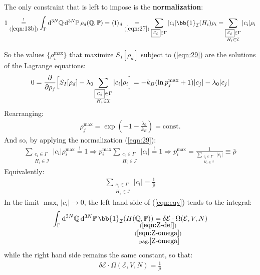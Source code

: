 \documentclass[../../main.tex]{subfiles}
\begin{document}
The only constraint that is left to impose is the \textbf{normalization}: 
\begin{align}\label{eqn:29}
    1 \underset{(\ref{eqn:13b})}{\overset{!}{=} } \int_{\Gamma} \dd[3N]{\mathbb{Q}} \dd[3N]{\mathbb{P}} \rho_d(\mathbb{Q}, \mathbb{P}) = \langle 1 \rangle_d \underset{(\ref{eqn:27})}{=}  \sum_{\boxed{c_i} \in \Gamma} |c_i| \bb{1}_{\mathcal{I}} (H_i) \rho_i =\sum_{\substack{\boxed{c_i} \in \Gamma\\H_i \in \mathcal{I}}} |c_i| \rho_i
\end{align}

So the values $\{\rho_i^{\max}\}$ that maximize $S_I[\rho_d]$ subject to (\ref{eqn:29}) are the solutions of the Lagrange equations:
\begin{align*}
    0 = \pdv{\rho_j} \Big[S_I[\rho_d]- \lambda_0 \sum_{\substack{\boxed{c_i} \in \Gamma\\H_i \in \mathcal{I}}} |c_i| \rho_i\Big] = -k_B(\ln p_j^{\max} + 1) |c_j| - \lambda_0 |c_j|
\end{align*}
Rearranging:
\begin{align}\label{eqn:30}
    \rho_j^{\max} = \exp\left(-1-\frac{\lambda_0}{k_B} \right) = \text{const.}
\end{align}
And so, by applying the normalization (\ref{eqn:29}):
\begin{align*}
    \sum_{\substack{\boxed{c_i} \in \Gamma\\H_i \in \mathcal{I}}} |c_i| \rho_i^{\max} \overset{!}{=} 1 \Rightarrow p_i^{\max} \sum_{\substack{\boxed{c_i} \in \Gamma\\H_i \in \mathcal{I}}} |c_i| \overset{!}{=} 1 \Rightarrow p_i^{\max} = \frac{1}{\sum_{\substack{\boxed{c_i} \in \Gamma\\H_i \in \mathcal{I}}} |c_i|} \equiv \bar{\rho}
\end{align*}
Equivalently:
\begin{align}\label{eqn:eqv}
    \sum_{\substack{\boxed{c_i} \in \Gamma\\H_i \in \mathcal{I}}} |c_i| = \frac{1}{\bar{\rho}} 
\end{align}
In the limit $\max_i |c_i| \to 0$, the left hand side of (\ref{eqn:eqv}) tends to the integral:
\begin{align*}
    \int_{\Gamma} \dd[3N]{\mathbb{Q}} \dd[3N]{\mathbb{P}} \bb{1}_{\mathcal{I}}(H(\mathbb{Q}, \mathbb{P})) \underset{\mathclap{\substack{(\ref{eqn:Z-def})\\
    (\ref{eqn:Z-omega})\\\rm{\ pag.} \pageref{Z-omega}}}
    }{=} \delta \mathcal{E}\cdot \Omega(\mathcal{E}, V, N)
\end{align*}
while the right hand side remains the same constant, so that:
\begin{align}\label{eqn:rho-omega}
    \delta \mathcal{E}\cdot \Omega(\mathcal{E}, V, N) = \frac{1}{\bar{\rho}} 
\end{align}
\end{document}
